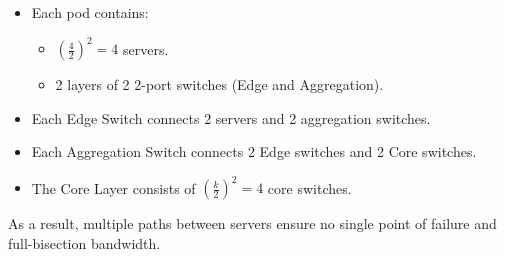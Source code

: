 \begin{examplebox}[: Fat-Tree with $k = 4$]
    \begin{itemize}
        \item Each pod contains:
        \begin{itemize}
            \item $\left(\frac{4}{2}\right)^{2} = 4$ servers.
            \item 2 layers of 2 2-port switches (Edge and Aggregation).
        \end{itemize}

        \item Each Edge Switch connects 2 servers and 2 aggregation switches.
        
        \item Each Aggregation Switch connects 2 Edge switches and 2 Core switches.

        \item The Core Layer consists of $\left(\frac{k}{2}\right)^{2} = 4$ core switches.
    \end{itemize}
    As a result, multiple paths between servers ensure no single point of failure and full-bisection bandwidth.
\end{examplebox}

